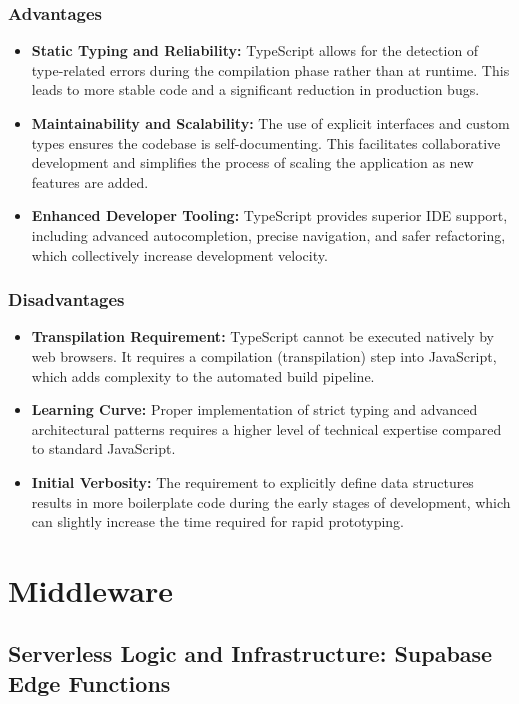 \subsubsection*{Advantages}
\begin{itemize}
    \item \textbf{Static Typing and Reliability:} TypeScript allows for the detection of type-related errors during the compilation phase rather than at runtime. This leads to more stable code and a significant reduction in production bugs.
    \item \textbf{Maintainability and Scalability:} The use of explicit interfaces and custom types ensures the codebase is self-documenting. This facilitates collaborative development and simplifies the process of scaling the application as new features are added.
    \item \textbf{Enhanced Developer Tooling:} TypeScript provides superior IDE support, including advanced autocompletion, precise navigation, and safer refactoring, which collectively increase development velocity.
\end{itemize}

\subsubsection*{Disadvantages}
\begin{itemize}
    \item \textbf{Transpilation Requirement:} TypeScript cannot be executed natively by web browsers. It requires a compilation (transpilation) step into JavaScript, which adds complexity to the automated build pipeline.
    \item \textbf{Learning Curve:} Proper implementation of strict typing and advanced architectural patterns requires a higher level of technical expertise compared to standard JavaScript.
    \item \textbf{Initial Verbosity:} The requirement to explicitly define data structures results in more boilerplate code during the early stages of development, which can slightly increase the time required for rapid prototyping.
\end{itemize}

\section{Middleware}

\subsection*{Serverless Logic and Infrastructure: Supabase Edge Functions}

